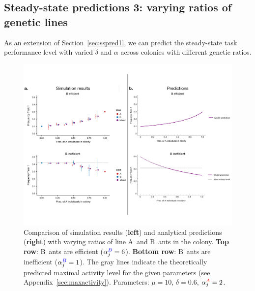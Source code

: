 \documentclass[11pt]{article}
\newcommand{\A}{{\color{red}A}}
\newcommand{\B}{{\color{blue}B}}
\begin{document}


\subsection{Steady-state predictions 3: varying ratios of genetic lines} \label{sec:sspred3}

As an extension of Section~\ref{sec:sspred1}, we can predict the steady-state task performance level with varied $\delta$ and $\alpha$ across colonies with different genetic ratios.

\begin{figure}[H]
    \centering
    \includegraphics[trim={0 1in 0 1.1in},clip,width=0.95\linewidth]{doc/mixes_comparison.pdf}
    \caption{Comparison of simulation results (\textbf{left}) and analytical predictions (\textbf{right}) with varying ratios of line \A\ and \B\ ants in the colony. \textbf{Top row}: \B\ ants are efficient ($\alpha_j^{\B}=6$). \textbf{Bottom row}: \B\ ants are inefficient ($\alpha_j^{\B}=1$). The gray lines indicate the theoretically predicted maximal activity level for the given parameters (see Appendix~\ref{sec:maxactivity}).
    Parameters: $\mu = 10$, $\delta = 0.6$, $\alpha_j^{\A} = 2$. }
    \label{fig:mixescomp}
\end{figure}

\end{document}
